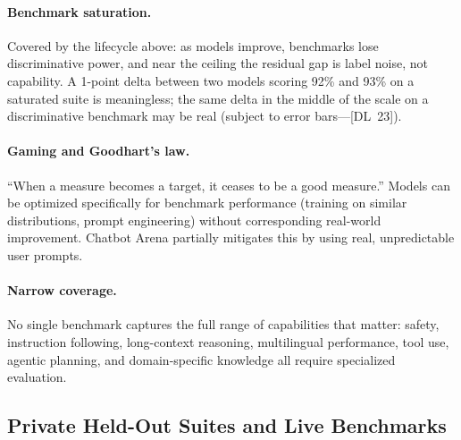 \paragraph{Benchmark saturation.}
Covered by the lifecycle above: as models improve, benchmarks lose
discriminative power, and near the ceiling the residual gap is label noise,
not capability.  A 1-point delta between two models scoring 92\% and 93\% on
a saturated suite is meaningless; the same delta in the middle of the scale
on a discriminative benchmark may be real (subject to error bars---[DL~23]).

\paragraph{Gaming and Goodhart's law.}
``When a measure becomes a target, it ceases to be a good measure.''  Models can
be optimized specifically for benchmark performance (training on similar
distributions, prompt engineering) without corresponding real-world improvement.
Chatbot Arena partially mitigates this by using real, unpredictable user prompts.

\paragraph{Narrow coverage.}
No single benchmark captures the full range of capabilities that matter:
safety, instruction following, long-context reasoning, multilingual performance,
tool use, agentic planning, and domain-specific knowledge all require specialized
evaluation.

\subsection{Private Held-Out Suites and Live Benchmarks}
\label{sec:private_evals}

